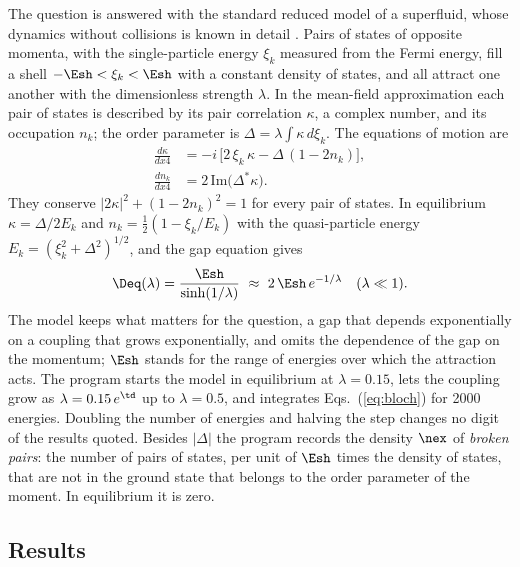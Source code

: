 The question is answered with the standard reduced model of a superfluid, whose dynamics without
collisions is known in detail \cite{BarankovLevitovSpivak2004}. Pairs of states of opposite momenta,
with the single-particle energy $\xi_k$ measured from the Fermi energy, fill a shell
$-\Esh<\xi_k<\Esh$ with a constant density of states, and all attract one another with the
dimensionless strength $\lambda$. In the mean-field approximation each pair of states is described by
its pair correlation $\kappa$, a complex number, and its occupation $n_k$; the order parameter is
$\Delta=\lambda\int\kappa\,d\xi_k$. The equations of motion are
\begin{align}
\frac{d\kappa}{dx4}&=-i\,\big[2\,\xi_k\,\kappa-\Delta\,(1-2n_k)\big],\nonumber\\
\frac{dn_k}{dx4}&=2\,\mathrm{Im}\big(\Delta^{*}\kappa\big).
\label{eq:bloch}
\end{align}
They conserve $|2\kappa|^{2}+(1-2n_k)^{2}=1$ for every pair of states. In equilibrium
$\kappa=\Delta/2E_k$ and $n_k=\tfrac12(1-\xi_k/E_k)$ with the quasi-particle energy
$E_k=(\xi_k^{2}+\Delta^{2})^{1/2}$, and the gap equation gives
\begin{equation}
\Deq(\lambda)=\frac{\Esh}{\sinh(1/\lambda)}\ \approx\ 2\,\Esh\,e^{-1/\lambda}\quad(\lambda\ll1).
\end{equation}
The model keeps what matters for the question, a gap that depends exponentially on a coupling that
grows exponentially, and omits the dependence of the gap on the momentum; $\Esh$ stands for the
range of energies over which the attraction acts. The program starts the model in equilibrium at
$\lambda=0.15$, lets the coupling grow as $\lambda=0.15\,e^{\td}$ up to $\lambda=0.5$, and integrates
Eqs.~(\ref{eq:bloch}) for 2000 energies. Doubling the number of energies and halving the step
changes no digit of the results quoted. Besides $|\Delta|$ the program records the density $\nex$ of
\emph{broken pairs}: the number of pairs of states, per unit of $\Esh$ times the density of states,
that are not in the ground state that belongs to the order parameter of the moment. In equilibrium
it is zero.

\subsection{Results}

